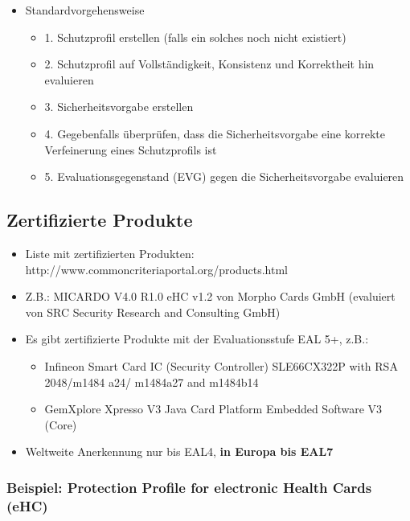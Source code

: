 \documentclass[openany]{book}
\begin{document}
\begin{itemize}
    \item Standardvorgehensweise
    \begin{itemize}
        \item 1. Schutzprofil erstellen (falls ein solches noch nicht existiert)
        \item 2. Schutzprofil auf Vollständigkeit, Konsistenz und Korrektheit hin evaluieren
        \item 3. Sicherheitsvorgabe erstellen
        \item 4. Gegebenfalls überprüfen, dass die Sicherheitsvorgabe eine korrekte Verfeinerung eines Schutzprofils ist
        \item 5. Evaluationsgegenstand (EVG) gegen die Sicherheitsvorgabe evaluieren
    \end{itemize}
\end{itemize}

\subsection{Zertifizierte Produkte}

\begin{itemize}
    \item Liste mit zertifizierten Produkten: http://www.commoncriteriaportal.org/products.html
    \item Z.B.: MICARDO V4.0 R1.0 eHC v1.2 von Morpho Cards GmbH (evaluiert von SRC Security Research and Consulting GmbH)
    \item Es gibt zertifizierte Produkte mit der Evaluationsstufe EAL 5+, z.B.:
    \begin{itemize}
        \item Infineon Smart Card IC (Security Controller) SLE66CX322P with RSA 2048/m1484 a24/ m1484a27 and m1484b14
        \item GemXplore Xpresso V3 Java Card Platform Embedded Software V3 (Core)
    \end{itemize}
    \item Weltweite Anerkennung nur bis EAL4, \textbf{in Europa bis EAL7}
\end{itemize}

\subsubsection{Beispiel: Protection Profile for electronic Health Cards (eHC)}
\end{document}
